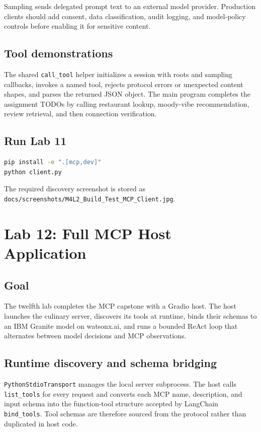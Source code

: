 \documentclass[11pt]{article}
\begin{document}
Sampling sends delegated prompt text to an external model provider. Production
clients should add consent, data classification, audit logging, and model-policy
controls before enabling it for sensitive content.

\subsection{Tool demonstrations}

The shared \texttt{call\_tool} helper initializes a session with roots and
sampling callbacks, invokes a named tool, rejects protocol errors or unexpected
content shapes, and parses the returned JSON object. The main program completes
the assignment TODOs by calling restaurant lookup, moody-vibe recommendation,
review retrieval, and then connection verification.

\subsection{Run Lab 11}

\begin{lstlisting}[language=bash]
pip install -e ".[mcp,dev]"
python client.py
\end{lstlisting}

The required discovery screenshot is stored as
\texttt{docs/screenshots/M4L2\_Build\_Test\_MCP\_Client.jpg}.

\section{Lab 12: Full MCP Host Application}

\subsection{Goal}

The twelfth lab completes the MCP capstone with a Gradio host. The host launches
the culinary server, discovers its tools at runtime, binds their schemas to an
IBM Granite model on watsonx.ai, and runs a bounded ReAct loop that alternates
between model decisions and MCP observations.

\subsection{Runtime discovery and schema bridging}

\texttt{PythonStdioTransport} manages the local server subprocess. The host calls
\texttt{list\_tools} for every request and converts each MCP name, description,
and input schema into the function-tool structure accepted by LangChain
\texttt{bind\_tools}. Tool schemas are therefore sourced from the protocol
rather than duplicated in host code.
\end{document}
